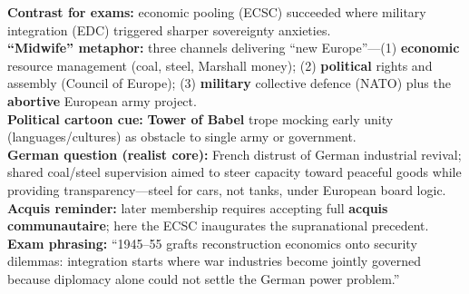 \documentclass[10pt,a4paper]{article}
\begin{document}
{\textbf{Contrast for exams:} economic pooling (ECSC) succeeded where military integration (EDC) triggered sharper sovereignty anxieties.\\
\textbf{``Midwife'' metaphor:} three channels delivering ``new Europe''---(1) \textbf{economic} resource management (coal, steel, Marshall money); (2) \textbf{political} rights and assembly (Council of Europe); (3) \textbf{military} collective defence (NATO) plus the \textbf{abortive} European army project.\\
\textbf{Political cartoon cue:} \textbf{Tower of Babel} trope mocking early unity (languages/cultures) as obstacle to single army or government.\\
\textbf{German question (realist core):} French distrust of German industrial revival; shared coal/steel supervision aimed to steer capacity toward peaceful goods while providing transparency---steel for cars, not tanks, under European board logic.\\
\textbf{Acquis reminder:} later membership requires accepting full \textbf{acquis communautaire}; here the ECSC inaugurates the supranational precedent.\\
\textbf{Exam phrasing:} ``1945--55 grafts reconstruction economics onto security dilemmas: integration starts where war industries become jointly governed because diplomacy alone could not settle the German power problem.''
}
\end{document}
